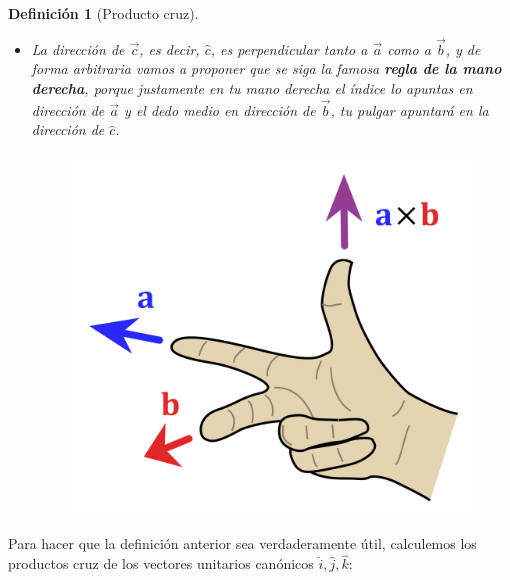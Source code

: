 \documentclass[12pt, fleqn]{report}                             %
\newtheorem{Definition}{Definición}[section]                    %
\begin{document}
\begin{Definition}[Producto cruz]
\begin{itemize}
            			\item La dirección de $\vec{c}$, es decir, $\hat{c}$, es perpendicular tanto a $\vec{a}$ como a $\vec{b}$, y de forma arbitraria vamos a proponer que se siga la famosa \textbf{regla de la mano derecha}, porque justamente en tu mano derecha el índice lo apuntas en dirección de $\vec{a}$ y el dedo medio en dirección de $\vec{b}$, tu pulgar apuntará en la dirección de $\hat{c}$.
            			\begin{figure}[H]
            				\centering
            				\includegraphics[scale=0.2]{rightHandRule.png}
            			\end{figure}
	            	\end{itemize}
            	\end{Definition}
            
            	Para hacer que la definición anterior sea verdaderamente útil, calculemos los productos cruz de los vectores unitarios canónicos $\hat{i}, \hat{j}, \hat{k}$:
            	
\end{document}
